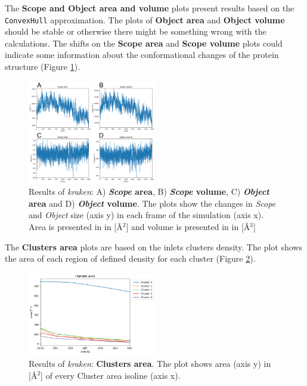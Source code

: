 \documentclass[9pt,tutorial, pubversion]{livecoms}
\begin{document}
The \textbf{Scope and Object area and volume} plots present results based on the \texttt{ConvexHull} approximation. The plots of \textbf{Object area} and \textbf{Object volume} should be stable or otherwise there might be something wrong with the calculations. The shifts on the \textbf{Scope area} and \textbf{Scope volume} plots could indicate some information about the conformational changes of the protein structure (Figure \ref{Tut3.2}).

\begin{figure}[htb!]
\centering
\includegraphics[width=0.5\textwidth]{Tut3.2.png}
\caption{Results of \textit{kraken}: A) \textbf{\textit{Scope} area}, B) \textbf{\textit{Scope} volume}, C) \textbf{\textit{Object} area} and D) \textbf{\textit{Object} volume}. The plots show the changes in \textit{Scope} and \textit{Object} size (axis y) in each frame of the simulation (axis x). Area is presented in in [Å\( \displaystyle ^{2}\)] and volume is presented in in [Å\( \displaystyle ^{3}\)]} 
\label{Tut3.2}
\end{figure}

The \textbf{Clusters area} plots are based on the inlets clusters density. The plot shows the area of each region of defined density for each cluster (Figure \ref{Tut3.3}).

\begin{figure}[htb!]
\centering
\includegraphics[width=0.5\textwidth]{Tut3.3.png}
\caption{Results of \textit{kraken}: \textbf{Clusters area}. The plot shows area (axis y) in [Å\( \displaystyle ^{2}\)] of every Cluster area isoline (axis x).}
\label{Tut3.3}
\end{figure}
\end{document}
